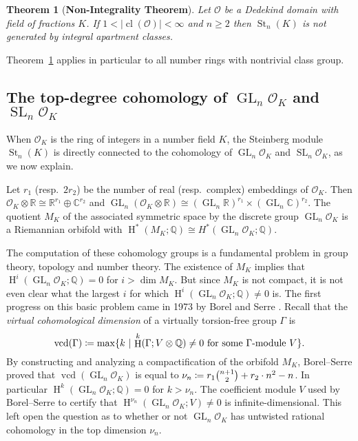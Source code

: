 \documentclass[11 pt]{article}
\theoremstyle{plain}
\newtheorem{maintheorem}{Theorem}
\theoremstyle{definition}
\numberwithin{equation}{section}
\DeclareMathOperator{\GL}{GL}
\DeclareMathOperator{\SL}{SL}
\newcommand\R{\ensuremath{\mathbb{R}}}
\newcommand\C{\ensuremath{\mathbb{C}}}
\newcommand\Q{\ensuremath{\mathbb{Q}}}
\DeclareMathOperator{\HH}{H}
\newcommand\Set[2]{\ensuremath{\{\text{#1 $|$ #2}\}}}
\renewcommand{\O}{\mathcal{O}}
\DeclareMathOperator{\vcd}{vcd}
\DeclareMathOperator{\class}{cl}
\DeclareMathOperator{\St}{St}
\newcommand\coloneq{\mathrel{\mathop:}\mkern-1.2mu=}
\newcommand\abs[1]{\left\lvert#1\right\rvert}
\newcommand\tensor{\otimes}
\newcommand\iso{\cong}
\newcommand\GLvcd{\nu_n}
\begin{document}
\begin{maintheorem}[\textbf{Non-Integrality Theorem}]
\label{maintheorem:nonintegrality}
\label{thm:Stnotgen}
Let $\O$ be a Dedekind domain with field of fractions $K$.  If  $1<\abs{\class(\O)}<\infty$ and $n\geq 2$ 
then $\St_n(K)$ is not generated by integral apartment classes.
\end{maintheorem}
Theorem~\ref{maintheorem:nonintegrality}
 applies in particular to all number rings with nontrivial class group.

\subsection{The top-degree cohomology of \texorpdfstring{$\GL_n \O_K$}{GLn(O)} and \texorpdfstring{$\SL_n \O_K$}{SLn(O)}}
\label{section:topcohomologyintro}

When $\O_K$ is the ring of integers in a number field $K$, the Steinberg module $\St_n(K)$ is directly connected to the cohomology of $\GL_n \O_K$ and $\SL_n \O_K$, as we now explain.   

Let $r_1$ (resp.\ $2r_2$) be the number of real (resp.\ complex) embeddings of $\O_K$.  Then  
${\O_K\tensor \R}\iso \R^{r_1}\oplus \C^{r_2}$ and $\GL_n (\O_K\tensor \R) \iso (\GL_n \R)^{r_1} \times (\GL_n \C)^{r_2}$.  The quotient $M_K$ of the associated symmetric space by the discrete group $\GL_n\O_K$ is a  Riemannian orbifold with $\HH^*(M_K;\Q)\iso H^*(\GL_n\O_K;\Q)$.

The computation of these cohomology groups is a fundamental problem in group theory, topology and number theory. The existence of $M_K$ implies that $\HH^i(\GL_n\O_K;\Q)=0$ for $i>\dim M_K$. But since $M_K$ is not compact,  it is not even clear what the largest $i$ for which $\HH^i(\GL_n\O_K;\Q)\neq 0$ is.   The first progress on this basic problem came in 1973 by Borel and Serre \cite{BorelSerreCorners}. Recall that the {\em virtual cohomological dimension} of a virtually torsion-free group $\Gamma$ is
\[\vcd(\Gamma)\coloneq  \max \Set{$k$}{$\HH^k(\Gamma;V\tensor \Q) \neq 0$ for some $\Gamma$-module $V$}.\]
By constructing and analyzing a compactification of the orbifold $M_K$, Borel--Serre proved that $\vcd(\GL_n \O_K)$ is equal to $\GLvcd\coloneq r_1\binom{n+1}{2} + r_2\cdot n^2 - n$. 
In particular $\HH^k(\GL_n \O_K;\Q)=0$ for $k>\GLvcd$.  The coefficient module $V$ used by Borel--Serre to certify that $\HH^{\GLvcd}(\GL_n \O_K;V)\neq 0$ is infinite-dimensional.  This left open the question as to whether or not $\GL_n \O_K$ has untwisted rational cohomology in the top dimension $\nu_n$.
\end{document}
